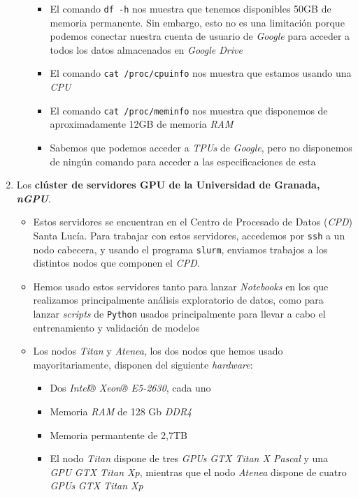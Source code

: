 \begin{enumerate}
\begin{itemize}
                \begin{itemize}
                    \item El comando \lstinline{df -h} nos muestra que tenemos disponibles 50GB de memoria permanente. Sin embargo, esto no es una limitación porque podemos conectar nuestra cuenta de usuario de \textit{Google} para acceder a todos los datos almacenados en \textit{Google Drive}
                    \item El comando \lstinline{cat /proc/cpuinfo} nos muestra que estamos usando una \textit{CPU} 
                    \item El comando \lstinline{cat /proc/meminfo} nos muestra que disponemos de aproximadamente 12GB de memoria \textit{RAM}
                    \item Sabemos que podemos acceder a \textit{TPUs} de \textit{Google}, pero no disponemos de ningún comando para acceder a las especificaciones de esta
                \end{itemize}
        \end{itemize}

    \item Los \textbf{clúster de servidores GPU de la Universidad de Granada, \textit{nGPU}}.
        \begin{itemize}
            \item Estos servidores se encuentran en el Centro de Procesado de Datos (\textit{CPD}) Santa Lucía. Para trabajar con estos servidores, accedemos por \lstinline{ssh} a un nodo cabecera, y usando el programa \lstinline{slurm}, enviamos trabajos a los distintos nodos que componen el \textit{CPD}.
            \item Hemos usado estos servidores tanto para lanzar \textit{Notebooks} en los que realizamos principalmente análisis exploratorio de datos, como para lanzar \textit{scripts} de \lstinline{Python} usados principalmente para llevar a cabo el entrenamiento y validación de modelos
            \item Los nodos \textit{Titan} y \textit{Atenea}, los dos nodos que hemos usado mayoritariamente, disponen del siguiente \textit{hardware}:
                \begin{itemize}
                    \item Dos \textit{Intel® Xeon® E5-2630}, cada uno
                    \item Memoria \textit{RAM} de 128 Gb \textit{DDR4}
                    \item Memoria permantente de 2,7TB
                    \item El nodo \textit{Titan} dispone de tres \textit{GPUs} \textit{GTX Titan X Pascal} y una \textit{GPU} \textit{GTX Titan Xp}, mientras que el nodo \textit{Atenea} dispone de cuatro \textit{GPUs} \textit{GTX Titan Xp}
                \end{itemize}
        \end{itemize}

\end{enumerate}

